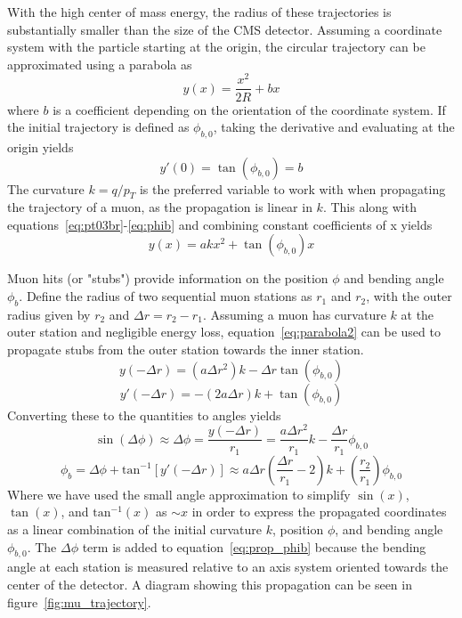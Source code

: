 With the high center of mass energy, the radius of these trajectories is substantially smaller than the size of the CMS detector. Assuming a coordinate system with the particle starting at the origin, the circular trajectory can be approximated using a parabola as
\begin{equation}
	\label{eq:parabola1}
	y(x)=\frac{x^2}{2R}+bx
\end{equation}
where $b$ is a coefficient depending on the orientation of the coordinate system. If the initial trajectory is defined as $\phi_{b,0}$, taking the derivative and evaluating at the origin yields
\begin{equation}
	\label{eq:phib}
	y'(0)=\tan(\phi_{b,0})=b
\end{equation}	
The curvature $k=q/p_{T}$ is the preferred variable to work with when propagating the trajectory of a muon, as the propagation is linear in $k$. This along with equations~\ref{eq:pt03br}-\ref{eq:phib} and combining constant coefficients of x yields
\begin{equation}
	\label{eq:parabola2}
	y(x)=akx^2+\tan(\phi_{b,0})x
\end{equation}

Muon hits (or "stubs") provide information on the position $\phi$ and bending angle $\phi_b$. Define the radius of two sequential muon stations as $r_1$ and $r_2$, with the outer radius given by $r_2$ and $\Delta r=r_2-r_1$. Assuming a muon has curvature $k$ at the outer station and negligible energy loss, equation~\ref{eq:parabola2} can be used to propagate stubs from the outer station towards the inner station.
\begin{equation}
	y(-\Delta r) = \left(a\Delta r^2\right)k-\Delta r\tan(\phi_{b,0})
\end{equation}
\begin{equation}
	y'(-\Delta r)=-\left(2a\Delta r\right)k+\tan(\phi_{b,0})
\end{equation}
Converting these to the quantities to angles yields
\begin{equation}
	\label{eq:prop_phi}
	\sin(\Delta\phi)\approx\Delta\phi=\frac{y(-\Delta r)}{r_1} = \frac{a\Delta r^2}{r_1}k-\frac{\Delta r}{r_1}\phi_{b,0}
\end{equation}
\begin{equation}
	\label{eq:prop_phib}
	\phi_b=\Delta\phi+\mathrm{tan}^{-1}\left[y'(-\Delta r)\right]\approx a\Delta r\left(\frac{\Delta r}{r_1}-2\right)k+\left(\frac{r_2}{r_1}\right)\phi_{b,0}
\end{equation}
Where we have used the small angle approximation to simplify $\sin(x)$, $\tan(x)$, and $\mathrm{tan}^{-1}(x)$ as $\sim x$ in order to express the propagated coordinates as a linear combination of the initial curvature $k$, position $\phi$, and bending angle $\phi_{b,0}$. The $\Delta\phi$ term is added to equation~\ref{eq:prop_phib} because the bending angle at each station is measured relative to an axis system oriented towards the center of the detector. A diagram showing this propagation can be seen in figure~\ref{fig:mu_trajectory}.

